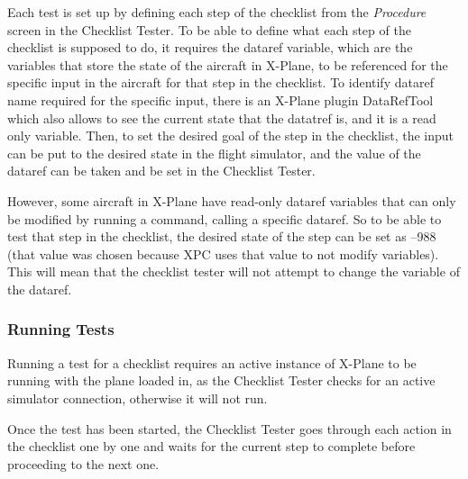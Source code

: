 \documentclass[../dissertation.tex]{subfiles}
\begin{document}
Each test is set up by defining each step of the checklist from the
\textit{Procedure} screen in the Checklist Tester.
To be able to define what each step of the checklist is supposed to do,
it requires the dataref variable, which are the variables that
store the state of the aircraft in X-Plane, to be referenced for the specific
input in the aircraft for that step in the checklist. To identify dataref name required
for the specific input, there is an X-Plane plugin DataRefTool
which also allows to see the current state that the datatref is, and it is a read only
variable. Then, to set the desired goal of the step in the checklist, the input can be put
to the desired state in the flight simulator, and the value of the dataref can be taken
and be set in the Checklist Tester.

However, some aircraft in X-Plane have read-only dataref variables that can only
be modified by running a command, calling a specific dataref. So to be able to
test that step in the checklist, the desired state of the step can be set as
--988 (that value was chosen because XPC uses that value to not modify variables).
This will mean that the checklist tester will not attempt to change the variable
of the dataref.

\subsubsection{Running Tests}

Running a test for a checklist requires an active instance of X-Plane
to be running with the plane loaded in, as the Checklist Tester
checks for an active simulator connection, otherwise it will not run.

Once the test has been started, the Checklist Tester goes through each action
in the checklist one by one and waits for the current step to complete before
proceeding to the next one.
\end{document}
